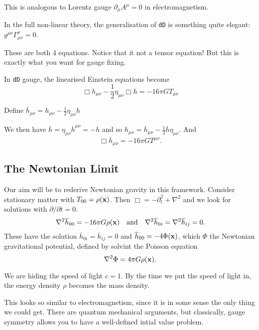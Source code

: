 This is analogous to Lorentz gauge $\partial_{\mu} A^{\mu} = 0$ in electromagnetism.

\begin{remark}
  In the full non-linear theory, the generalisation of \texttt{dD} is something quite elegant: $g^{\mu\nu} \Gamma^{\rho}_{\mu\nu} = 0$.

  These are both 4 equations. Notice that it not a tensor equation! But this is exactly what you want for gauge fixing.

  In \texttt{dD} gauge, the linearised Einstein equations become
  \begin{equation}
    \Box h_{\mu\nu} - \frac{1}{2} \eta_{\mu\nu} \Box h = -16 \pi G T_{\mu\nu}
  \end{equation}
  \begin{definition}[]
    Define $\overline{h}_{\mu\nu} = h_{\mu\nu} - \frac{1}{2} \eta_{\mu\nu} h$ 
  \end{definition}
  We then have $\overline{h} = \eta_{\mu\nu} \overline{h}^{\mu\nu} = -h$ and so $h_{\mu\nu} = \overline{h}_{\mu\nu} - \frac{1}{2} \overline{h}\eta_{\mu\nu}$. 
  And \begin{equation}\Box \overline{h}_{\mu\nu} = - 16 \pi G T^{\mu\nu}.\end{equation}
\end{remark}

\subsection{The Newtonian Limit}%
\label{sub:the_newtonian_limit}

Our aim will be to rederive Newtonian gravity in this framework.
Consider stationary matter with $T_{00} = \rho(\vb{x})$. Then $\Box = -\partial_t^2 + \nabla^2$ and we look for solutions with $\partial / \partial t = 0$. 
\begin{equation}
  \nabla^2 \overline{h}_{00} = -16 \pi G \rho(\vb{x}) \quad \text{and} \quad \nabla^2 \overline{h}_{0i} = \nabla^2 \overline{h}_{ij} = 0.
\end{equation}
These have the solution $\overline{h}_{0i} = \overline{h}_{ij} = 0$ and $\overline{h}_{00} = - 4 \Phi (\vb{x})$, which $\Phi$ the Newtonian gravitational potential, defined by solvint the Poisson equation
\begin{equation}
  \nabla^2 \Phi = 4 \pi G \rho(\vb{x}).
\end{equation}

\begin{remark}
  We are hiding the speed of light $c = 1$. By the time we put the speed of light in, the energy density $\rho$ becomes the mass density.
\end{remark}
\begin{remark}
  This looks so similar to electromagnetism, since it is in some sense the only thing we could get.
  There are quantum mechanical arguments, but classically, gauge symmetry allows you to have a well-defined intial value problem.
\end{remark}

